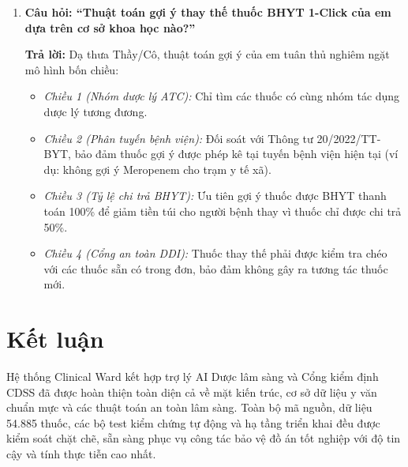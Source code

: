 \documentclass[12pt,a4paper]{article}
\begin{document}
\begin{enumerate}[leftmargin=1.5em]
    \item \textbf{Câu hỏi: ``Thuật toán gợi ý thay thế thuốc BHYT 1-Click của em dựa trên cơ sở khoa học nào?''}
    
    \textbf{Trả lời:} Dạ thưa Thầy/Cô, thuật toán gợi ý của em tuân thủ nghiêm ngặt mô hình bốn chiều:
    \begin{itemize}[leftmargin=1.2em]
        \item \textit{Chiều 1 (Nhóm dược lý ATC):} Chỉ tìm các thuốc có cùng nhóm tác dụng dược lý tương đương.
        \item \textit{Chiều 2 (Phân tuyến bệnh viện):} Đối soát với Thông tư 20/2022/TT-BYT, bảo đảm thuốc gợi ý được phép kê tại tuyến bệnh viện hiện tại (ví dụ: không gợi ý Meropenem cho trạm y tế xã).
        \item \textit{Chiều 3 (Tỷ lệ chi trả BHYT):} Ưu tiên gợi ý thuốc được BHYT thanh toán 100\% để giảm tiền túi cho người bệnh thay vì thuốc chỉ được chi trả 50\%.
        \item \textit{Chiều 4 (Cổng an toàn DDI):} Thuốc thay thế phải được kiểm tra chéo với các thuốc sẵn có trong đơn, bảo đảm không gây ra tương tác thuốc mới.
    \end{itemize}
\end{enumerate}

\section{Kết luận}
Hệ thống Clinical Ward kết hợp trợ lý AI Dược lâm sàng và Cổng kiểm định CDSS đã được hoàn thiện toàn diện cả về mặt kiến trúc, cơ sở dữ liệu y văn chuẩn mực và các thuật toán an toàn lâm sàng. Toàn bộ mã nguồn, dữ liệu 54.885 thuốc, các bộ test kiểm chứng tự động và hạ tầng triển khai đều được kiểm soát chặt chẽ, sẵn sàng phục vụ công tác bảo vệ đồ án tốt nghiệp với độ tin cậy và tính thực tiễn cao nhất.
\end{document}
